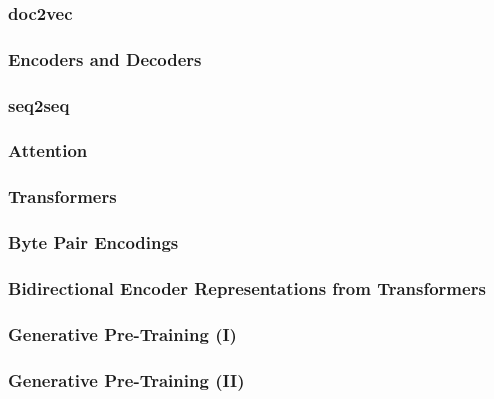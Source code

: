 \subsubsection{doc2vec}\label{sec:language-models:doc2vec}

\subsubsection{Encoders and Decoders}\label{sec:language-models:encoders-decoders}
\subsubsection{seq2seq}\label{sec:language-models:seq2seq}

\subsubsection{Attention}\label{sec:language-models:attention}


\subsubsection{Transformers}\label{sec:language-models:transformers}
\subsubsection{Byte Pair Encodings}\label{sec:language-models:bpe}

\subsubsection{Bidirectional Encoder Representations from Transformers}\label{sec:language-models:bert}
\subsubsection{Generative Pre-Training (I)}\label{sec:language-models:gpt}
\subsubsection{Generative Pre-Training (II)}\label{sec:language-models:gpt-2}
